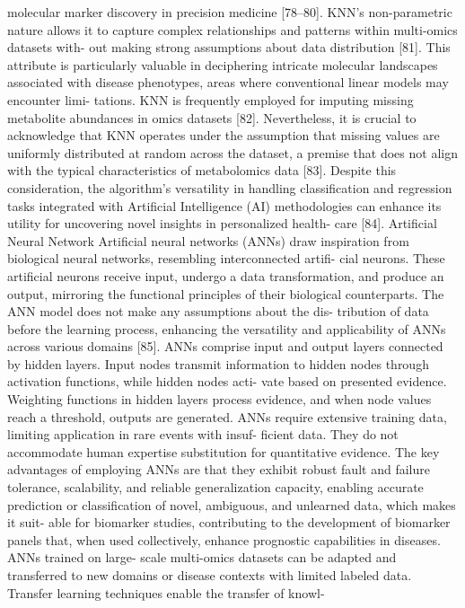molecular marker discovery in precision medicine [78–80].
KNN’s non-parametric nature allows it to capture complex
relationships and patterns within multi-omics datasets with-
out making strong assumptions about data distribution [81].
This attribute is particularly valuable in deciphering intricate
molecular landscapes associated with disease phenotypes,
areas where conventional linear models may encounter limi-
tations. KNN is frequently employed for imputing missing
metabolite abundances in omics datasets [82]. Nevertheless,
it is crucial to acknowledge that KNN operates under the
assumption that missing values are uniformly distributed at
random across the dataset, a premise that does not align
with the typical characteristics of metabolomics data [83].
Despite this consideration, the algorithm’s versatility in
handling classification and regression tasks integrated with
Artificial Intelligence (AI) methodologies can enhance its
utility for uncovering novel insights in personalized health-
care [84].
Artificial Neural Network
Artificial neural networks (ANNs) draw inspiration from
biological neural networks, resembling interconnected artifi-
cial neurons. These artificial neurons receive input, undergo
a data transformation, and produce an output, mirroring the
functional principles of their biological counterparts. The
ANN model does not make any assumptions about the dis-
tribution of data before the learning process, enhancing the
versatility and applicability of ANNs across various domains
[85]. ANNs comprise input and output layers connected by
hidden layers. Input nodes transmit information to hidden
nodes through activation functions, while hidden nodes acti-
vate based on presented evidence. Weighting functions in
hidden layers process evidence, and when node values reach
a threshold, outputs are generated. ANNs require extensive
training data, limiting application in rare events with insuf-
ficient data. They do not accommodate human expertise
substitution for quantitative evidence. The key advantages
of employing ANNs are that they exhibit robust fault and
failure tolerance, scalability, and reliable generalization
capacity, enabling accurate prediction or classification of
novel, ambiguous, and unlearned data, which makes it suit-
able for biomarker studies, contributing to the development
of biomarker panels that, when used collectively, enhance
prognostic capabilities in diseases. ANNs trained on large-
scale multi-omics datasets can be adapted and transferred to
new domains or disease contexts with limited labeled data.
Transfer learning techniques enable the transfer of knowl-
